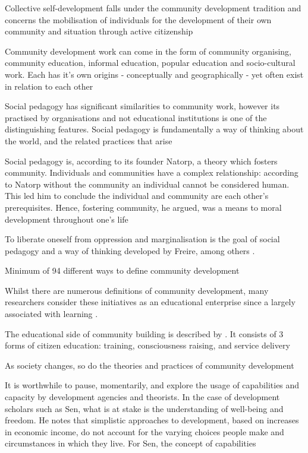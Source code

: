 Collective self-development falls under the community development tradition and concerns the mobilisation of individuals for the development of their own community and situation through active citizenship \citep{Eriksson2011}

Community development work can come in the form of community organising, community education, informal education, popular education and socio-cultural work. Each has it's own origins - conceptually and geographically - yet often exist in relation to each other \citep{Eriksson2011}

Social pedagogy has significant similarities to community work, however its practised by organisations and not educational institutions is one of the distinguishing features. Social pedagogy is fundamentally a way of thinking about the world, and the related practices that arise \citep{Eriksson2011}

Social pedagogy is, according to its founder Natorp, a theory which fosters community. Individuals and communities have a complex relationship: according to Natorp without the community an individual cannot be considered human. This led him to conclude the individual and community are each other's prerequisites. Hence, fostering community, he argued, was a means to moral development throughout one's life \citep[Natorp 1904 as cited in][]{Eriksson2011}

To liberate oneself from oppression and marginalisation is the goal of social pedagogy and a way of thinking developed by Freire, among others \citep{Eriksson2011}.


Minimum of 94 different ways to define community development \citep{Mayo2008}

Whilst there are numerous definitions of community development, many researchers consider these initiatives as an educational enterprise since a largely associated with learning \citep{Eriksson2011}.

The educational side of community building is described by \citep{VanderVeen2003}. It consists of 3 forms of citizen education: training, consciousness raising, and service delivery \citep{Eriksson2011}

As society changes, so do the theories and practices of community development \citep{Eriksson2011}






It is worthwhile to pause, momentarily, and explore the usage of capabilities and capacity by development agencies and theorists. In the case of development scholars such as Sen, what is at stake is the understanding of well-being and freedom. He notes that simplistic approaches to development, based on increases in economic income, do not account for the varying choices people make and circumstances in which they live. For Sen, the concept of capabilities %


